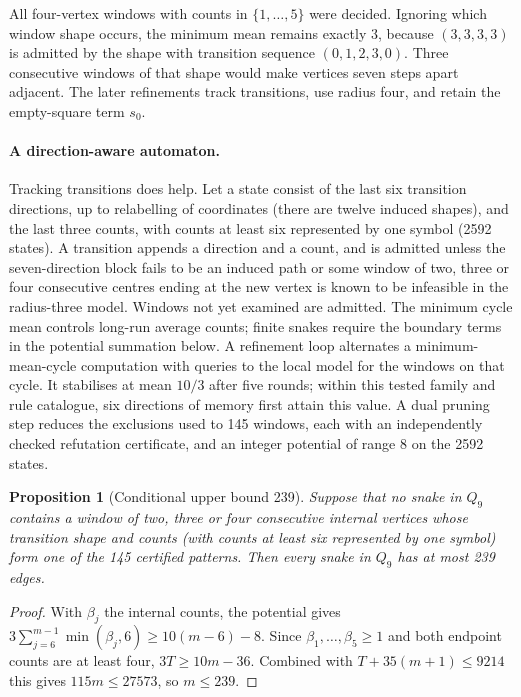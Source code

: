 \documentclass[11pt,a4paper]{article}
\newtheorem{proposition}[theorem]{Proposition}
\theoremstyle{definition}
\theoremstyle{remark}
\newcommand{\Q}{Q}
\begin{document}
 All four-vertex windows with counts in $\{1,\ldots,5\}$ were decided. Ignoring which window shape occurs, the minimum mean remains exactly $3$, because $(3,3,3,3)$ is admitted by the shape with transition sequence $(0,1,2,3,0)$. Three consecutive windows of that shape would make vertices seven steps apart adjacent. The later refinements track transitions, use radius four, and retain the empty-square term $s_0$.

\paragraph{A direction-aware automaton.} Tracking transitions does help. Let a state consist of the last six transition directions, up to relabelling of coordinates (there are twelve induced shapes), and the last three counts, with counts at least six represented by one symbol (2592 states). A transition appends a direction and a count, and is admitted unless the seven-direction block fails to be an induced path or some window of two, three or four consecutive centres ending at the new vertex is known to be infeasible in the radius-three model. Windows not yet examined are admitted. The minimum cycle mean controls long-run average counts; finite snakes require the boundary terms in the potential summation below. A refinement loop alternates a minimum-mean-cycle computation with queries to the local model for the windows on that cycle. It stabilises at mean $10/3$ after five rounds; within this tested family and rule catalogue, six directions of memory first attain this value. A dual pruning step reduces the exclusions used to 145 windows, each with an independently checked refutation certificate, and an integer potential of range $8$ on the 2592 states.

\begin{proposition}[Conditional upper bound 239]\label{prop:direction239}
Suppose that no snake in $\Q_9$ contains a window of two, three or four consecutive internal vertices whose transition shape and counts (with counts at least six represented by one symbol) form one of the 145 certified patterns. Then every snake in $\Q_9$ has at most 239 edges.
\end{proposition}
\begin{proof}
With $\beta_j$ the internal counts, the potential gives $3\sum_{j=6}^{m-1}\min(\beta_j,6)\ge10(m-6)-8$. Since $\beta_1,\ldots,\beta_5\ge1$ and both endpoint counts are at least four, $3T\ge10m-36$. Combined with $T+35(m+1)\le9214$ this gives $115m\le27573$, so $m\le239$.
\end{proof}
\end{document}
